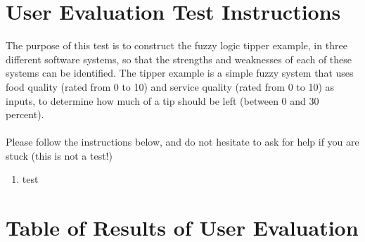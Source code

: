 \section{User Evaluation Test Instructions}
\label{app-userEval}
The purpose of this test is to construct the fuzzy logic tipper example, in three different software systems, so that the strengths and weaknesses of each of these systems can be identified. The tipper example is a simple fuzzy system that uses food quality (rated from 0 to 10) and service quality (rated from 0 to 10) as inputs, to determine how much of a tip should be left (between 0 and 30 percent). \ \\
\ \\
Please follow the instructions below, and do not hesitate to ask for help if you are stuck (this is not a test!)

\begin{enumerate}
\item test
\end{enumerate}


\section{Table of Results of User Evaluation}